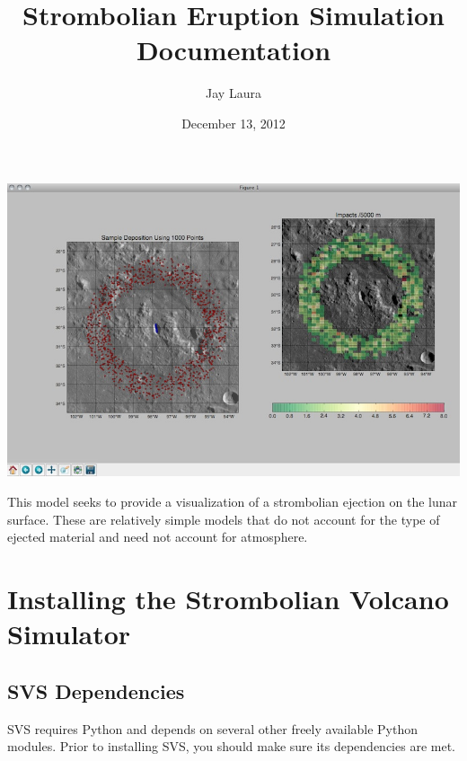 \documentclass[letterpaper,10pt,english]{sphinxmanual}
\title{Strombolian Eruption Simulation Documentation}
\date{December 13, 2012}
\author{Jay Laura}
\begin{document}
\maketitle
\tableofcontents
{}\label{index::doc}


\includegraphics{sample.jpg}

This model seeks to provide a visualization of a strombolian ejection on the lunar surface.  These are relatively simple models that do not account for the type of ejected material and need not account for atmosphere.


\chapter{Installing the Strombolian Volcano Simulator}
\label{Installation:installation}\label{Installation:installing-the-strombolian-volcano-simulator}\label{Installation:welcome-to-strombolian-eruption-simulation-documentation}\label{Installation::doc}

\section{SVS Dependencies}
\label{Installation:svs-dependencies}
SVS requires Python and depends on several other freely available Python
modules. Prior to installing SVS, you should make sure its dependencies are met.
\end{document}

